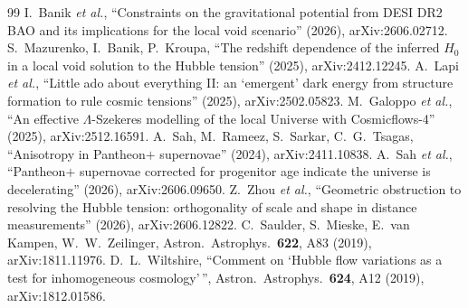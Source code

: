 \documentclass[aps,prd,twocolumn,nofootinbib,superscriptaddress,floatfix]{revtex4-2}
\begin{document}
\begin{thebibliography}{99}
 I.~Banik \emph{et al.}, ``Constraints on the gravitational potential from DESI DR2 BAO and its implications for the local void scenario'' (2026), arXiv:2606.02712.
 S.~Mazurenko, I.~Banik, P.~Kroupa, ``The redshift dependence of the inferred $H_0$ in a local void solution to the Hubble tension'' (2025), arXiv:2412.12245.
 A.~Lapi \emph{et al.}, ``Little ado about everything II: an `emergent' dark energy from structure formation to rule cosmic tensions'' (2025), arXiv:2502.05823.
 M.~Galoppo \emph{et al.}, ``An effective $\Lambda$-Szekeres modelling of the local Universe with Cosmicflows-4'' (2025), arXiv:2512.16591.
 A.~Sah, M.~Rameez, S.~Sarkar, C.~G.~Tsagas, ``Anisotropy in Pantheon$+$ supernovae'' (2024), arXiv:2411.10838.
 A.~Sah \emph{et al.}, ``Pantheon$+$ supernovae corrected for progenitor age indicate the universe is decelerating'' (2026), arXiv:2606.09650.
 Z.~Zhou \emph{et al.}, ``Geometric obstruction to resolving the Hubble tension: orthogonality of scale and shape in distance measurements'' (2026), arXiv:2606.12822.
 C.~Saulder, S.~Mieske, E.~van Kampen, W.~W.~Zeilinger, Astron.\ Astrophys.\ \textbf{622}, A83 (2019), arXiv:1811.11976.
 D.~L.~Wiltshire, ``Comment on `Hubble flow variations as a test for inhomogeneous cosmology'\,'', Astron.\ Astrophys.\ \textbf{624}, A12 (2019), arXiv:1812.01586.
\end{thebibliography}
\end{document}

